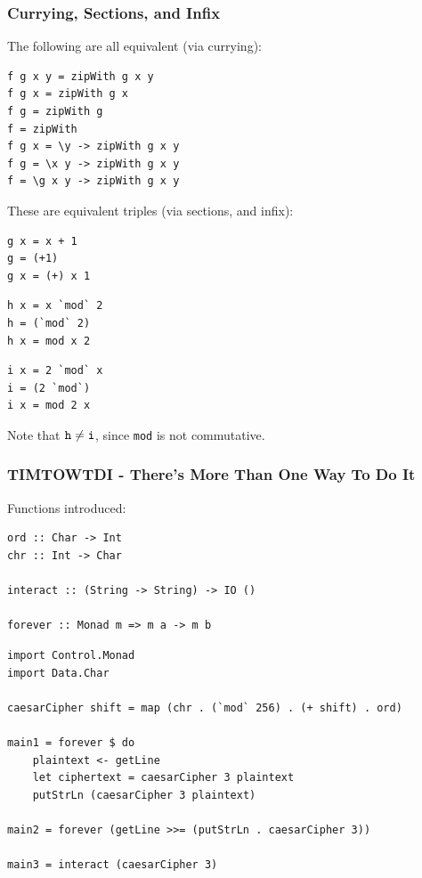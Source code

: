 \documentclass{beamer}
\begin{document}
\begin{frame}[fragile]
\frametitle{Currying, Sections, and Infix}
The following are all equivalent (via currying):
\begin{Verbatim}[frame=single, fontsize=\scriptsize]
f g x y = zipWith g x y
f g x = zipWith g x
f g = zipWith g
f = zipWith
f g x = \y -> zipWith g x y
f g = \x y -> zipWith g x y
f = \g x y -> zipWith g x y
\end{Verbatim}
These are equivalent triples (via sections, and infix):
\begin{Verbatim}[frame=single, fontsize=\scriptsize]
g x = x + 1
g = (+1)
g x = (+) x 1
\end{Verbatim}
\begin{Verbatim}[frame=single, fontsize=\scriptsize]
h x = x `mod` 2
h = (`mod` 2)
h x = mod x 2
\end{Verbatim}
\begin{Verbatim}[frame=single, fontsize=\scriptsize]
i x = 2 `mod` x
i = (2 `mod`)
i x = mod 2 x
\end{Verbatim}
Note that $\verb|h| \neq \verb|i|$, since \verb|mod| is not commutative.
\end{frame}

\begin{frame}[fragile]
\frametitle{TIMTOWTDI - There's More Than One Way To Do It}
Functions introduced:
\begin{Verbatim}[frame=single, fontsize=\scriptsize]
ord :: Char -> Int
chr :: Int -> Char

interact :: (String -> String) -> IO ()

forever :: Monad m => m a -> m b
\end{Verbatim}
\begin{Verbatim}[frame=single, fontsize=\scriptsize]
import Control.Monad
import Data.Char

caesarCipher shift = map (chr . (`mod` 256) . (+ shift) . ord)

main1 = forever $ do
    plaintext <- getLine
    let ciphertext = caesarCipher 3 plaintext
    putStrLn (caesarCipher 3 plaintext)

main2 = forever (getLine >>= (putStrLn . caesarCipher 3))

main3 = interact (caesarCipher 3)
\end{Verbatim}
\end{frame}
\end{document}
